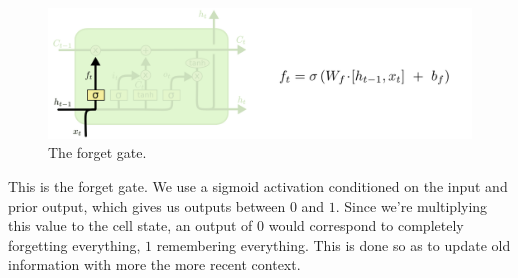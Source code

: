 \documentclass{article}
\begin{document}
    \begin{figure}[H]
        \centerline{\includegraphics[scale=0.4]{LSTM1.png}}
        \caption{The forget gate.}
        \label{fig:lstm1}
    \end{figure}
    This is the forget gate. We use a sigmoid activation conditioned on the input and prior output, which gives us outputs between $0$ and $1$. Since we're multiplying this value to the cell state, an output of $0$ would correspond to completely forgetting everything, $1$ remembering everything. This is done so as to update old information with more the more recent context.
    
\end{document}
